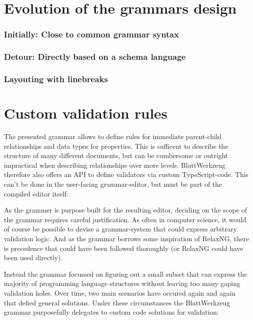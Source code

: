 \documentclass[]{report}
\begin{document}
\section{Evolution of the grammars design}

\subsubsection{Initially: Close to common grammar syntax}

\subsubsection{Detour: Directly based on a schema language}

\subsubsection{Layouting with linebreaks}

\section{Custom validation rules}

The presented grammar allows to define rules for immediate parent-child relationships and data types for properties. This is sufficent to describe the structure of many different documents, but can be cumbersome or outright impractical when describing relationships over more levels. Blatt\-Werkzeug therefore also offers an API to define validators via custom TypeScript-code. This can't be done in the user-facing grammar-editor, but must be part of the compiled editor itself.

As the grammer is purpose built for the resulting editor, deciding on the scope of the grammar requires careful justification. As often in computer science, it would of course be possible to devise a grammar-system that could express arbitrary validation logic. And as the grammar borrows some inspiration of RelaxNG, there is precedence that could have been followed thoroughly (or RelaxNG could have been used directly).

Instead the grammar focussed on figuring out a small subset that can express the majority of programming language structures without leaving too many gaping validation holes. Over time, two main scenarios have occured again and again that defied general solutions. Under these circumstances the Blatt\-Werkzeug grammar purposefully delegates to custom code solutions for validation:
\end{document}
